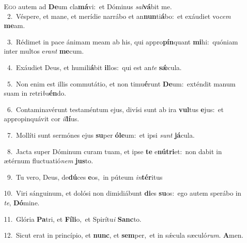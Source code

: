 \lettrine{\initial\textcolor{\initialcolor}{E}}{go} autem ad \textbf{De}\-um cla\-\textbf{má}\-vi:~\star et Dóminus \textit{sal}\-\textbf{vá}bit me.\\
{\numbfont\textcolor{\numbcolor}{~2.}}~Véspere, et mane, et merídie narrábo et an\-\textbf{nun}\-ti\-\textbf{á}\-bo:~\star et exáudiet vo\textit{cem} \textbf{me}\-am.\par
{\numbfont\textcolor{\numbcolor}{~3.}}~Rédimet in pace ánimam meam ab his, qui appro\-\textbf{pín}\-quant \textbf{mi}\-hi:~\star quóniam inter multos e\textit{rant} \textbf{me}\-cum.\par
{\numbfont\textcolor{\numbcolor}{~4.}}~Exáudiet Deus, et humili\-\textbf{á}\-bit \textbf{il}\-los:~\star qui est an\textit{te} \textbf{sǽ}\-cula.\par
{\numbfont\textcolor{\numbcolor}{~5.}}~Non enim est illis commutátio, et non timu\-\textbf{é}\-runt \textbf{De}\-um:~\star exténdit manum suam in retri\-\textit{bu}\-\textbf{én}do.\par
{\numbfont\textcolor{\numbcolor}{~6.}}~Contaminavérunt testaméntum ejus, divísi sunt ab ira \textbf{vul}\-tus \textbf{e}\-jus:~\star et appropinquávit cor \textit{il}\-\textbf{lí}us.\par
{\numbfont\textcolor{\numbcolor}{~7.}}~Mollíti sunt sermónes ejus \textbf{su}\-per \textbf{ó}\-\textbf{le}um:~\star et ipsi \textit{sunt} \textbf{já}\-cula.\par
{\numbfont\textcolor{\numbcolor}{~8.}}~Jacta super Dóminum curam tuam, et ipse \textbf{te} e\-\textbf{nú}\-\textbf{tri}et:~\star non dabit in ætérnum fluctuatió\textit{nem} \textbf{jus}\-to.\par
{\numbfont\textcolor{\numbcolor}{~9.}}~Tu vero, Deus, de\-\textbf{dú}\-ces \textbf{e}\-os,~\star in púteum \textit{in}\-\textbf{tér}itus\par
{\numbfont\textcolor{\numbcolor}{10.}}~Viri sánguinum, et dolósi non dimidiábunt \textbf{di}\-es \textbf{su}\-os:~\star ego autem sperábo in \textit{te}\-, \textbf{Dó}\-mine.\par
{\numbfont\textcolor{\numbcolor}{11.}}~Glória \textbf{Pa}\-tri, et \textbf{Fí}\-\textbf{li}o,~\star et Spirítu\textit{i} \textbf{Sanc}\-to.\par
{\numbfont\textcolor{\numbcolor}{12.}}~Sicut erat in princípio, et \textbf{nunc}\-, et \textbf{sem}\-per,~\star et in sǽcula sæculó\-\textit{rum}\-. \textbf{A}\-men.\par
